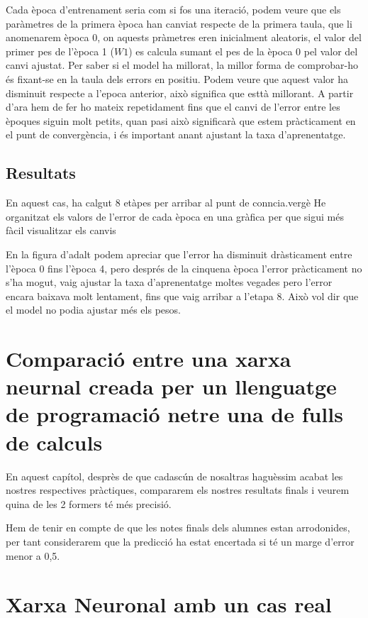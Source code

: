 Cada època d'entrenament seria com si fos una iteració, podem veure que els paràmetres de la primera època han canviat respecte de la primera taula, que li anomenarem època 0, on aquests pràmetres eren inicialment aleatoris, el valor del primer pes de l'època 1 ($W1$) es calcula sumant el pes de la època 0 pel valor del canvi ajustat.
Per saber si el model ha millorat, la millor forma de comprobar-ho és fixant-se en la taula dels errors en positiu. Podem veure que aquest valor ha disminuit respecte a l'epoca anterior, això significa que esttà millorant.
A partir d'ara hem de fer ho mateix repetidament fins que el canvi de l'error entre les èpoques siguin molt petits, quan pasi això significarà que estem pràcticament en el punt de convergència, i és important anant ajustant la taxa d'aprenentatge.
\subsection{Resultats}
En aquest cas, ha calgut 8 etàpes per arribar al punt de conncia.vergè He organitzat els valors de l'error de cada època en una gràfica per que sigui més fàcil visualitzar els canvis

En la figura d'adalt podem apreciar que l'error ha disminuit dràsticament entre l'època 0 fins l'època 4, pero després de la cinquena època l'error pràcticament no s'ha mogut, vaig ajustar la taxa d'aprenentatge moltes vegades pero l'error encara baixava molt lentament, fins que vaig arribar a l'etapa 8. Això vol dir que el model no podia ajustar més els pesos.

\section{Comparació entre una xarxa neurnal creada per un llenguatge de programació netre una de fulls de calculs}
En aquest capítol, desprès de que cadascún de nosaltras haguèssim acabat les nostres respectives pràctiques, compararem els nostres resultats finals i veurem quina de les 2 formers té més precisió.

Hem de tenir en compte de que les notes finals dels alumnes estan arrodonides, per tant considerarem que la predicció ha estat encertada si té un marge d'error menor a 0,5.
\section{Xarxa Neuronal amb un cas real}\label{sec:12}
